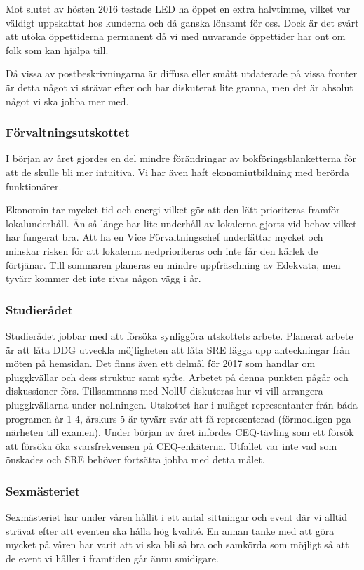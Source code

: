 \documentclass[../_main/handlingar.tex]{subfiles}
\begin{document}
Mot slutet av hösten 2016 testade LED ha öppet en extra halvtimme, vilket var väldigt uppskattat hos kunderna och då ganska lönsamt för oss. Dock är det svårt att utöka öppettiderna permanent då vi med nuvarande öppettider har ont om folk som kan hjälpa till.

Då vissa av postbeskrivningarna är diffusa eller smått utdaterade på vissa fronter är detta något vi strävar efter och har diskuterat lite granna, men det är absolut något vi ska jobba mer med.

\subsubsection*{Förvaltningsutskottet}
I början av året gjordes en del mindre förändringar av bokföringsblanketterna för att de skulle bli mer intuitiva. Vi har även haft ekonomiutbildning med berörda funktionärer.

Ekonomin tar mycket tid och energi vilket gör att den lätt prioriteras framför lokalunderhåll. Än så länge har lite underhåll av lokalerna gjorts vid behov vilket har fungerat bra. Att ha en Vice Förvaltningschef underlättar mycket och minskar risken för att lokalerna nedprioriteras och inte får den kärlek de förtjänar. Till sommaren planeras en mindre uppfräschning av Edekvata, men tyvärr kommer det inte rivas någon vägg i år.

\subsubsection*{Studierådet}
Studierådet jobbar med att försöka synliggöra utskottets arbete. Planerat arbete är att låta DDG utveckla möjligheten att låta SRE lägga upp anteckningar från möten på hemsidan. Det finns även ett delmål för 2017 som handlar om pluggkvällar och dess struktur samt syfte. Arbetet på denna punkten pågår och diskussioner förs. Tillsammans med NollU diskuteras hur vi vill arrangera pluggkvällarna under nollningen. Utskottet har i nuläget representanter från båda programen år 1-4, årskurs 5 är tyvärr svår att få representerad (förmodligen pga närheten till examen). Under början av året infördes CEQ-tävling som ett försök att försöka öka svarsfrekvensen på CEQ-enkäterna. Utfallet var inte vad som önskades och SRE behöver fortsätta jobba med detta målet.

\subsubsection*{Sexmästeriet}
Sexmästeriet har under våren hållit i ett antal sittningar och event där vi alltid strävat efter att eventen ska hålla hög kvalité. En annan tanke med att göra mycket på våren har varit att vi ska bli så bra och samkörda som möjligt så att de event vi håller i framtiden går ännu smidigare.
\end{document}
